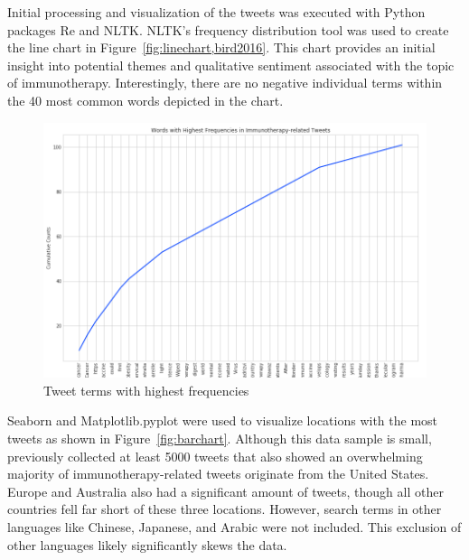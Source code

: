 Initial processing and visualization of the tweets was executed with
Python packages Re and NLTK.  NLTK's frequency distribution tool was
used to create the line chart in
Figure~\ref{fig:linechart,bird2016}.  This chart provides an
initial insight into potential themes and qualitative sentiment
associated with the topic of immunotherapy.  Interestingly, there are
no negative individual terms within the 40 most common words depicted
in the chart.

\begin{figure}[H]
\centering
\includegraphics[width=\columnwidth]{images/linechart.png}
\caption{Tweet terms with highest frequencies}
\label{fig:linechart}
\end{figure} 

Seaborn and Matplotlib.pyplot were used to visualize locations with
the most tweets as shown in Figure~\ref{fig:barchart}. Although this
data sample is small, previously collected at least 5000 tweets that
also showed an overwhelming majority of immunotherapy-related tweets
originate from the United States.  Europe and Australia also had a
significant amount of tweets, though all other countries fell far
short of these three locations.  However, search terms in other
languages like Chinese, Japanese, and Arabic were not included.  This
exclusion of other languages likely significantly skews the data.

